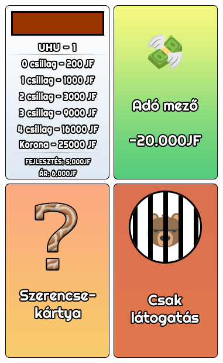 \begin{figure}[h!]
\centering
\includegraphics[scale=0.4]{images/p1.png}
\includegraphics[scale=0.4]{images/ado.png}
\includegraphics[scale=0.4]{images/szk.png}
\includegraphics[scale=0.4]{images/bori_latogatas.png}

\end{figure}
